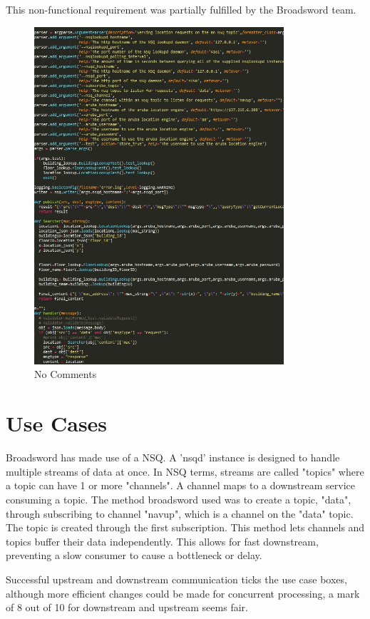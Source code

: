 \documentclass{article}
\begin{document}
\begin{flushleft}
This non-functional requirement was partially fulfilled by the Broadsword team.
\end{flushleft}


\begin{figure}[ht]
  \includegraphics[width=350px]{Images/nocomments.jpg}
  \caption{No Comments}
  \label{Figure showing the lack of comments and explanation}
\end{figure}

\section{Use Cases}

\begin{flushleft}
Broadsword has made use of a NSQ.
A 'nsqd' instance is designed to handle multiple streams of data at once.
In NSQ terms, streams are called "topics" where a topic can have 1 or more "channels".
A channel maps to a downstream service consuming a topic.
The method broadsword used was to create a topic, "data", through subscribing to channel "navup", which is a channel on the "data" topic. The topic is created through the first subscription.
This method lets channels and topics buffer their data independently. This allows for fast downstream, preventing a slow consumer to cause a bottleneck or delay.
\bigskip

Successful upstream and downstream communication ticks the use case boxes, although more efficient changes could be made for concurrent processing, a mark of 8 out of 10 for downstream and upstream seems fair.
\end{flushleft}
\end{document}
